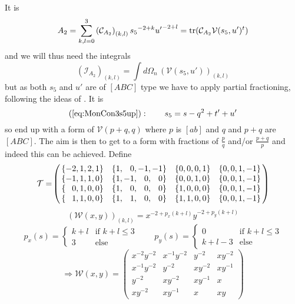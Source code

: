 It is
\begin{equation}
A_2 = \sum_{k,l=0}^{3} \left(\mathcal C_{A_2}\right)_{(k,l)} {s_5}^{-2+k} {u'}^{-2+l} = \operatorname{\text{tr}}(\mathcal C_{A_2} \mathcal V(s_5,u')^t)
\end{equation}
and we will thus need the integrals
\begin{equation}
\left(\mathcal I_{A_2}\right)_{(k,l)} = \int\!d\Omega_n\,\left(\mathcal V(s_5,u')\right)_{(k,l)}
\end{equation}
but as both $s_5$ and $u'$ are of $[ABC]$ type we have to apply partial fractioning, following the ideas of \cite[Ch. 5]{Bojak:2000eu}. It is 
\begin{equation}
(\ref{eq:MonCon3s5up}): \qquad s_5 = s-q^2+t'+u'
\end{equation}
so end up with a form of $\mathcal V(p+q,q)$ where $p$ is $[ab]$ and $q$ and $p+q$ are $[ABC]$. The aim is then to get to a form with fractions of $\frac p q$ and/or $\frac {p+q} p$ and indeed this can be achieved. Define
\begin{equation}
\mathcal T =\!\left(\!\!
\begin{array}{cccc}
\{-2,1,2,1\} & \{1,\hphantom{-} 0,-1,-1\} & \{0,0,0,1\} & \{0,0,1,-1\}\\
\{-1,1,1,0\} & \{1,-1,\hphantom{-} 0,\hphantom{-} 0\}  & \{0,0,1,0\} & \{0,0,1,-1\}\\
\{\hphantom{-} 0,1,0,0\}  & \{1,\hphantom{-} 0,\hphantom{-} 0,\hphantom{-} 0\}   & \{1,0,0,0\} & \{0,0,1,-1\}\\
\{\hphantom{-} 1,1,0,0\}  & \{1,\hphantom{-} 1,\hphantom{-} 0,\hphantom{-} 0\}   & \{1,1,0,0\} & \{0,0,1,-1\}
\end{array}\!\!
\right)
\end{equation}
\begin{equation}
\left(\mathcal W(x,y)\right)_{(k,l)} = x^{-2+p_x(k+l)} y^{-2+p_y(k+l)}
\end{equation}
\begin{equation}
p_x(s) = \left\{\begin{array}{ll}k+l&\text{if }k+l\leq 3\\ 3 &\text{else}\end{array}\right.
\qquad
p_y(s) = \left\{\begin{array}{ll}0&\text{if }k+l\leq 3\\ k+l-3 &\text{else}\end{array}\right.
\end{equation}
\begin{equation}
\Rightarrow \mathcal W(x,y) = \!\left(\!\!
\begin{array}{cccc}
x^{-2}y^{-2} & x^{-1}y^{-2} & y^{-2} & xy^{-2}\\
x^{-1}y^{-2} & y^{-2} & xy^{-2} & xy^{-1} \\
y^{-2} & xy^{-2} & xy^{-1} & x\\
xy^{-2} & xy^{-1} & x & xy
\end{array}\!\!
\right)
\end{equation}
